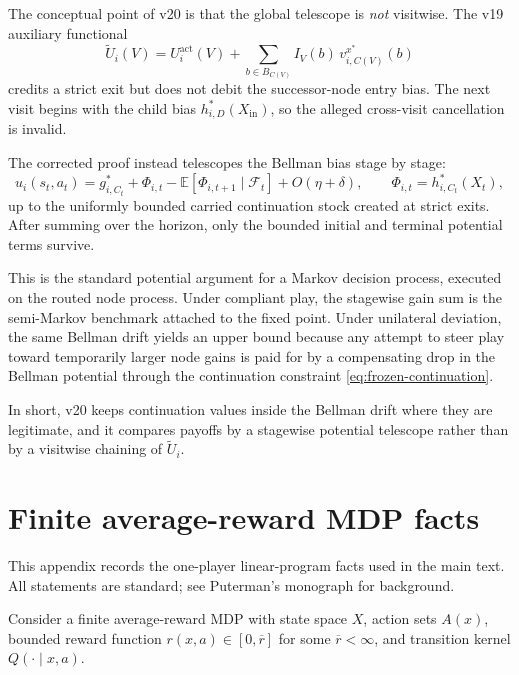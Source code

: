 \documentclass[12pt]{article}
\theoremstyle{definition}
\newcommand{\E}{\mathbb{E}}
\newcommand{\1}{\mathbf{1}}
\newcommand{\cF}{\mathcal{F}}
\begin{document}
The conceptual point of v20 is that the global telescope is \emph{not}
visitwise. The v19 auxiliary functional
\[
\widetilde U_i(V)
=
U_i^{\mathrm{act}}(V)
+
\sum_{b\in B_{C(V)}}I_V(b)\,v_{i,C(V)}^{x^*}(b)
\]
credits a strict exit but does not debit the successor-node entry bias. The next
visit begins with the child bias $h_{i,D}^*(X_{\mathrm{in}})$, so the alleged
cross-visit cancellation is invalid.

The corrected proof instead telescopes the Bellman bias stage by stage:
\[
u_i(s_t,a_t)
=
g_{i,C_t}^*
+
\Phi_{i,t}
-
\E[\Phi_{i,t+1}\mid \cF_t]
+
O(\eta+\delta),
\qquad
\Phi_{i,t}=h_{i,C_t}^*(X_t),
\]
up to the uniformly bounded carried continuation stock created at strict exits.
After summing over the horizon, only the bounded initial and terminal potential
terms survive.

This is the standard potential argument for a Markov decision process, executed on
the routed node process. Under compliant play, the stagewise gain sum is the
semi-Markov benchmark attached to the fixed point. Under unilateral deviation,
the same Bellman drift yields an upper bound because any attempt to steer play
toward temporarily larger node gains is paid for by a compensating drop in the
Bellman potential through the continuation constraint
\eqref{eq:frozen-continuation}.

In short, v20 keeps continuation values inside the Bellman drift where they are
legitimate, and it compares payoffs by a stagewise potential telescope rather
than by a visitwise chaining of $\widetilde U_i$.
\appendix



\section{Finite average-reward MDP facts}
\label{app:mdp}

This appendix records the one-player linear-program facts used in the main text.
All statements are standard; see Puterman's monograph \cite{Puterman1994} for
background.

Consider a finite average-reward MDP with state space $X$, action sets $A(x)$,
bounded reward function $r(x,a)\in[0,\overline r]$ for some $\overline r<\infty$,
and transition kernel $Q(\cdot\mid x,a)$.
\end{document}

